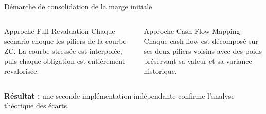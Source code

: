 \documentclass[10pt,aspectratio=169]{beamer}
\newcommand{\keyword}[1]{\textcolor{AccentBlue}{\textbf{#1}}}
\newcommand{\done}{\textcolor{SuccessGreen}{\ding{51}}}
\begin{document}
\begin{frame}{Démarche de consolidation de la marge initiale}
  \centering

  \vspace{0.55cm}
  \begin{columns}[T,onlytextwidth]
    \begin{block}{Approche Full Revaluation}
      Chaque scénario choque les piliers de la courbe ZC. La courbe stressée
      est interpolée, puis chaque obligation est entièrement revalorisée.
    \end{block}

    \begin{block}{Approche Cash-Flow Mapping}
      Chaque cash-flow est décomposé sur ses deux piliers voisins avec des
      poids préservant sa valeur et sa variance historique.
    \end{block}
  \end{columns}

  \vspace{0.2cm}
  \centering
  \keyword{Résultat :} une seconde implémentation indépendante confirme
  l'analyse théorique des écarts.
\end{frame}
\end{document}
